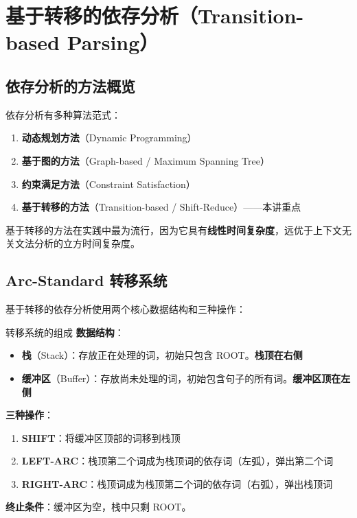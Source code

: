 \section{基于转移的依存分析（Transition-based Parsing）}

\subsection{依存分析的方法概览}

依存分析有多种算法范式：

\begin{enumerate}
    \item \textbf{动态规划方法}（Dynamic Programming）
    \item \textbf{基于图的方法}（Graph-based / Maximum Spanning Tree）
    \item \textbf{约束满足方法}（Constraint Satisfaction）
    \item \textbf{基于转移的方法}（Transition-based / Shift-Reduce）——本讲重点
\end{enumerate}

基于转移的方法在实践中最为流行，因为它具有\textbf{线性时间复杂度}，远优于上下文无关文法分析的立方时间复杂度。

\subsection{Arc-Standard 转移系统}

基于转移的依存分析使用两个核心数据结构和三种操作：

\begin{importantbox}{转移系统的组成}
\textbf{数据结构}：
\begin{itemize}
    \item \textbf{栈}（Stack）：存放正在处理的词，初始只包含 ROOT。\textbf{栈顶在右侧}
    \item \textbf{缓冲区}（Buffer）：存放尚未处理的词，初始包含句子的所有词。\textbf{缓冲区顶在左侧}
\end{itemize}

\textbf{三种操作}：
\begin{enumerate}
    \item \textbf{SHIFT}：将缓冲区顶部的词移到栈顶
    \item \textbf{LEFT-ARC}：栈顶第二个词成为栈顶词的依存词（左弧），弹出第二个词
    \item \textbf{RIGHT-ARC}：栈顶词成为栈顶第二个词的依存词（右弧），弹出栈顶词
\end{enumerate}

\textbf{终止条件}：缓冲区为空，栈中只剩 ROOT。
\end{importantbox}

